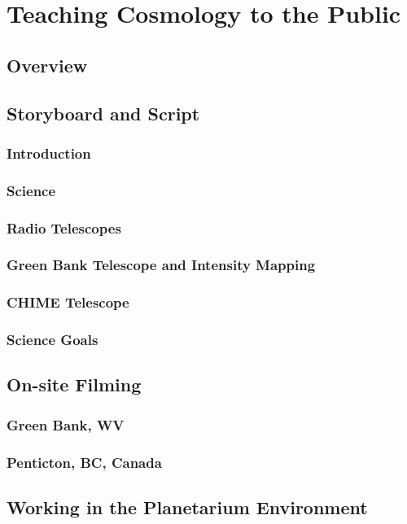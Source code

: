 \chapter{Teaching \cm Cosmology to the Public}\label{Ch:Planet}

\section{Overview}
\section{Storyboard and Script}

\subsection{Introduction}
\subsection{\cm Science}
\subsection{Radio Telescopes}
\subsection{Green Bank Telescope and Intensity Mapping}
\subsection{CHIME Telescope}
\subsection{Science Goals}

\section{On-site Filming}

\subsection{Green Bank, WV}
\subsection{Penticton, BC, Canada}

\section{Working in the Planetarium Environment}

